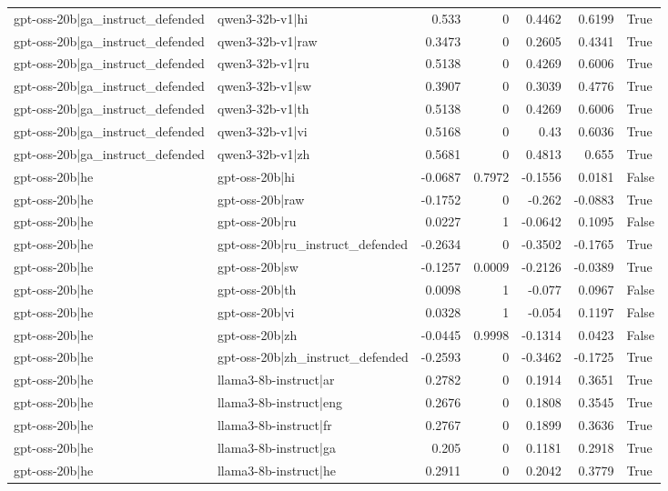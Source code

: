 \begin{table}
\begin{tabular}{l l r r r r l}
gpt-oss-20b|ga_instruct_defended & qwen3-32b-v1|hi & 0.533 & 0 & 0.4462 & 0.6199 & True \\
gpt-oss-20b|ga_instruct_defended & qwen3-32b-v1|raw & 0.3473 & 0 & 0.2605 & 0.4341 & True \\
gpt-oss-20b|ga_instruct_defended & qwen3-32b-v1|ru & 0.5138 & 0 & 0.4269 & 0.6006 & True \\
gpt-oss-20b|ga_instruct_defended & qwen3-32b-v1|sw & 0.3907 & 0 & 0.3039 & 0.4776 & True \\
gpt-oss-20b|ga_instruct_defended & qwen3-32b-v1|th & 0.5138 & 0 & 0.4269 & 0.6006 & True \\
gpt-oss-20b|ga_instruct_defended & qwen3-32b-v1|vi & 0.5168 & 0 & 0.43 & 0.6036 & True \\
gpt-oss-20b|ga_instruct_defended & qwen3-32b-v1|zh & 0.5681 & 0 & 0.4813 & 0.655 & True \\
gpt-oss-20b|he & gpt-oss-20b|hi & -0.0687 & 0.7972 & -0.1556 & 0.0181 & False \\
gpt-oss-20b|he & gpt-oss-20b|raw & -0.1752 & 0 & -0.262 & -0.0883 & True \\
gpt-oss-20b|he & gpt-oss-20b|ru & 0.0227 & 1 & -0.0642 & 0.1095 & False \\
gpt-oss-20b|he & gpt-oss-20b|ru_instruct_defended & -0.2634 & 0 & -0.3502 & -0.1765 & True \\
gpt-oss-20b|he & gpt-oss-20b|sw & -0.1257 & 0.0009 & -0.2126 & -0.0389 & True \\
gpt-oss-20b|he & gpt-oss-20b|th & 0.0098 & 1 & -0.077 & 0.0967 & False \\
gpt-oss-20b|he & gpt-oss-20b|vi & 0.0328 & 1 & -0.054 & 0.1197 & False \\
gpt-oss-20b|he & gpt-oss-20b|zh & -0.0445 & 0.9998 & -0.1314 & 0.0423 & False \\
gpt-oss-20b|he & gpt-oss-20b|zh_instruct_defended & -0.2593 & 0 & -0.3462 & -0.1725 & True \\
gpt-oss-20b|he & llama3-8b-instruct|ar & 0.2782 & 0 & 0.1914 & 0.3651 & True \\
gpt-oss-20b|he & llama3-8b-instruct|eng & 0.2676 & 0 & 0.1808 & 0.3545 & True \\
gpt-oss-20b|he & llama3-8b-instruct|fr & 0.2767 & 0 & 0.1899 & 0.3636 & True \\
gpt-oss-20b|he & llama3-8b-instruct|ga & 0.205 & 0 & 0.1181 & 0.2918 & True \\
gpt-oss-20b|he & llama3-8b-instruct|he & 0.2911 & 0 & 0.2042 & 0.3779 & True \\

\end{tabular}
\end{table}
